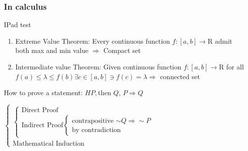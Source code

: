 



\cfoot{\thepage} %

\subsubsection{In calculus}

IPad test

\begin{enumerate}
	\item Extreme Value Theorem: Every continuous function $f:[a,b]\rightarrow\mathrm{R}$ admit both max and min value $\Rightarrow$ Compact set
	\item Intermediate value Theorem: Given continuous function $f:[a,b]\rightarrow \mathrm{R}$ for all $f(a) \leq \lambda \leq f(b) \exists c \in [a,b] \ni f(c) = \lambda \Rightarrow$ connected set
\end{enumerate}

How to prove a statement: $H P,$then $Q$, $P \Rightarrow Q$

$\begin{cases}
	\begin{cases}
	\text{Direct Proof}\\\text{Indirect Proof}\begin{cases}\text{contrapositive $\sim Q \Rightarrow \sim P$} \\ \text{by contradiction}\end{cases}
	\end{cases}\\
	\text{Mathematical Induction}
\end{cases}$


\newpage


\newpage



